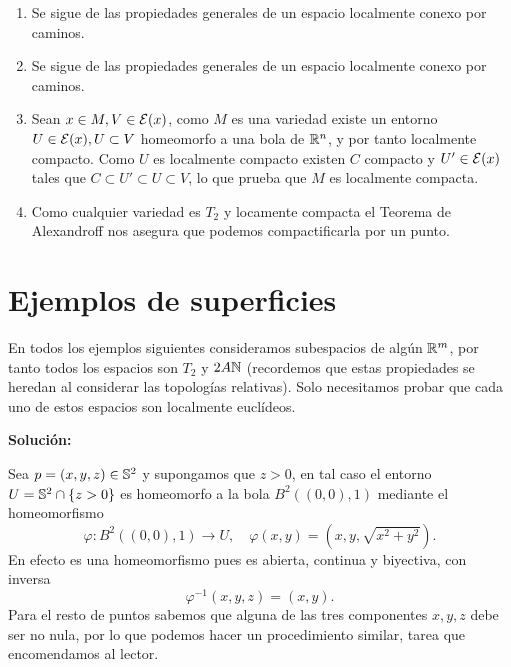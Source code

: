 {\begin{enumerate}
      \item Se sigue de las propiedades generales de un espacio localmente conexo por caminos.
      \item Se sigue de las propiedades generales de un espacio localmente conexo por caminos.
      \item Sean $x\in M, V\in\mathcal{E}(x)$, como $M$ es una variedad existe un entorno $U\in\mathcal{E}(x),U\subset V$ homeomorfo a una bola de $\mathbb{R}^n$, y por tanto localmente compacto. Como $U$ es localmente compacto existen $C$ compacto y $U'\in\mathcal{E}(x)$ tales que $C\subset U'\subset U\subset V$, lo que prueba que $M$ es localmente compacta.
      \item Como cualquier variedad es $T_2$ y locamente compacta el Teorema de Alexandroff nos asegura que podemos compactificarla por un punto.
    \end{enumerate}
}

\clearpage

\section{Ejemplos de superficies}

En todos los ejemplos siguientes consideramos subespacios de algún $\mathbb{R}^m$, por tanto todos los espacios son $T_2$ y $2A\mathbb{N}$ (recordemos que estas propiedades se heredan al considerar las topologías relativas). Solo necesitamos probar que cada uno de estos espacios son localmente euclídeos.


\noindent\textbf{Solución:}

  Sea $p=(x,y,z)\in\mathbb{S}^2$ y supongamos que $z>0$, en tal caso el entorno $U=\mathbb{S}^2\cap\{z>0\}$ es homeomorfo a la bola $B^2((0,0),1)$ mediante el homeomorfismo
  \[
  \varphi:B^2((0,0),1)\to U,\quad \varphi(x,y)=(x,y,\sqrt{x^2+y^2}).
  \]
  En efecto es una homeomorfismo pues es abierta, continua y biyectiva, con inversa
  \[
  \varphi^{-1}(x,y,z)=(x,y).
  \]
  Para el resto de puntos sabemos que alguna de las tres componentes $x,y,z$ debe ser no nula, por lo que podemos hacer un procedimiento similar, tarea que encomendamos al lector.





